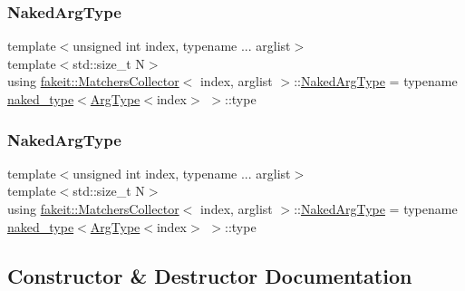 \subsubsection{\texorpdfstring{NakedArgType}{NakedArgType}\hspace{0.1cm}{\footnotesize\ttfamily [8/9]}}
{\footnotesize\ttfamily template$<$unsigned int index, typename ... arglist$>$ \\
template$<$std\+::size\+\_\+t N$>$ \\
using \mbox{\hyperlink{classfakeit_1_1MatchersCollector}{fakeit\+::\+Matchers\+Collector}}$<$ index, arglist $>$\+::\mbox{\hyperlink{classfakeit_1_1MatchersCollector_aeda8ced6a2f0cb7c6e4f916f18a91730}{Naked\+Arg\+Type}} =  typename \mbox{\hyperlink{structfakeit_1_1naked__type}{naked\+\_\+type}}$<$\mbox{\hyperlink{classfakeit_1_1MatchersCollector_aaba0fca8c182a698dda8ca056c29fe5f}{Arg\+Type}}$<$index$>$ $>$\+::type}

\mbox{\label{classfakeit_1_1MatchersCollector_aeda8ced6a2f0cb7c6e4f916f18a91730}} 
\subsubsection{\texorpdfstring{NakedArgType}{NakedArgType}\hspace{0.1cm}{\footnotesize\ttfamily [9/9]}}
{\footnotesize\ttfamily template$<$unsigned int index, typename ... arglist$>$ \\
template$<$std\+::size\+\_\+t N$>$ \\
using \mbox{\hyperlink{classfakeit_1_1MatchersCollector}{fakeit\+::\+Matchers\+Collector}}$<$ index, arglist $>$\+::\mbox{\hyperlink{classfakeit_1_1MatchersCollector_aeda8ced6a2f0cb7c6e4f916f18a91730}{Naked\+Arg\+Type}} =  typename \mbox{\hyperlink{structfakeit_1_1naked__type}{naked\+\_\+type}}$<$\mbox{\hyperlink{classfakeit_1_1MatchersCollector_aaba0fca8c182a698dda8ca056c29fe5f}{Arg\+Type}}$<$index$>$ $>$\+::type}



\subsection{Constructor \& Destructor Documentation}
\mbox{\label{classfakeit_1_1MatchersCollector_ac5e0254e23626d189f329de8051137a6}} 
